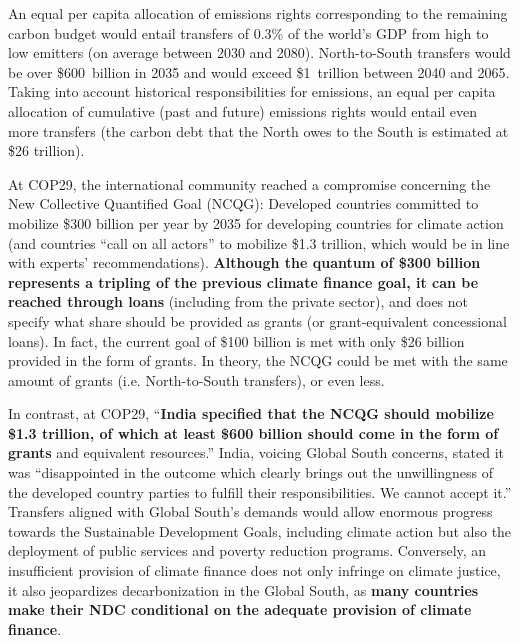 \documentclass[12pt,english]{article}
\begin{document}
An equal per capita allocation of emissions rights corresponding to the remaining carbon budget would entail transfers of 0.3\% of the world's GDP from high to low emitters (on average between 2030 and 2080). North-to-South transfers would be over \$600~billion in 2035 and would exceed \$1~trillion between 2040 and 2065. 
Taking into account historical responsibilities for emissions, an equal per capita allocation of cumulative (past and future) emissions rights would entail even more transfers (the carbon debt that the North owes to the South is estimated at \$26 trillion\cite{fabre_global_2024,fanning_compensation_2023}). 

At COP29, the international community reached a compromise concerning the New Collective Quantified Goal (NCQG): Developed countries committed to mobilize \$300 billion per year by 2035 for developing countries for climate action (and countries ``call on all actors'' to mobilize \$1.3 trillion, which would be in line with experts' recommendations\cite{unfccc_new_2024,songwe_raising_2024}). \textbf{Although the quantum of \$300 billion represents a tripling of the previous climate finance goal, it can be reached through loans} (including from the private sector), and does not specify what share should be provided as grants (or grant-equivalent concessional loans). In fact, the current goal of \$100 billion is met with only \$26 billion provided in the form of grants.\cite{oecd_climate_2024} 
In theory, the NCQG could be met with the same amount of grants (i.e. North-to-South transfers), or even less. 

In contrast, at COP29, ``\textbf{India specified that the NCQG should mobilize \$1.3 trillion, of which at least \$600 billion should come in the form of grants} and equivalent resources.''\cite{earth_negotiations_bulletin_daily_2024} India, voicing Global South concerns, stated it was ``disappointed in the outcome which clearly brings out the unwillingness of the developed country parties to fulfill their responsibilities. We cannot accept it.'' Transfers aligned with Global South's demands would allow enormous progress towards the Sustainable Development Goals, including climate action but also the deployment of public services and poverty reduction programs. Conversely, an insufficient provision of climate finance does not only infringe on climate justice, it also jeopardizes decarbonization in the Global South, as \textbf{many countries make their NDC conditional on the adequate provision of climate finance}. 
\end{document}

